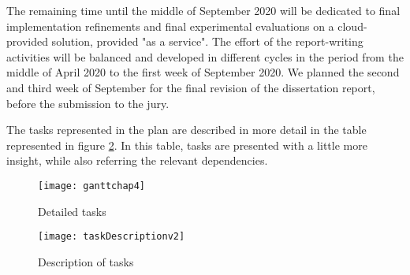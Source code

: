 The remaining time until the middle of September 2020 will be dedicated to final implementation refinements and final experimental evaluations on a cloud-provided solution, provided "as a service". The effort of the report-writing activities will be balanced and developed in different cycles in the period from the middle of April 2020 to the first week of September 2020. We planned the second and third week of September for the final revision of the dissertation report, before the submission to the jury. 

The tasks represented in the plan are described in more detail in the table represented in figure \ref{fig:taskDescription}. In this table, tasks are presented with a little more insight, while also referring the relevant dependencies.

\newpage

\begin{figure}[htbp]
	\centerline{\texttt{[image: ganttchap4]}}
	\caption{Detailed tasks}
	\label{fig:ganttPlannedTasks}
\end{figure}

\newpage

\begin{figure}[htbp]
	\centerline{\texttt{[image: taskDescriptionv2]}}
	\caption{Description of tasks}
	\label{fig:taskDescription}
\end{figure}


